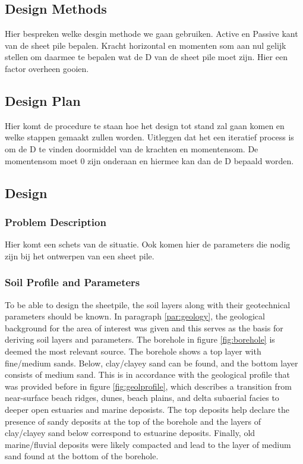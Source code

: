 \subsection{Design Methods}

Hier bespreken welke desgin methode we gaan gebruiken. Active en Passive kant van de sheet pile bepalen. Kracht horizontal en momenten som aan nul gelijk stellen om daarmee te bepalen wat de D van de sheet pile moet zijn. Hier een factor overheen gooien. 


\subsection{Design Plan}

Hier komt de procedure te staan hoe het design tot stand zal gaan komen en welke stappen gemaakt zullen worden. Uitleggen dat het een iteratief process is om de D te vinden doormiddel van de krachten en momentensom. De momentensom moet 0 zijn onderaan en hiermee kan dan de D bepaald worden. 

\subsection{Design}

\subsubsection{Problem Description}

Hier komt een schets van de situatie. Ook komen hier de parameters die nodig zijn bij het ontwerpen van een sheet pile.

\subsubsection{Soil Profile and Parameters}
To be able to design the sheetpile, the soil layers along with their geotechnical parameters should be known. In paragraph \ref{par:geology}, the geological background for the area of interest was given and this serves as the basis for deriving soil layers and parameters. The borehole in figure \ref{fig:borehole} is deemed the most relevant source. The borehole shows a top layer with fine/medium sands. Below, clay/clayey sand can be found, and the bottom layer consists of medium sand. This is in accordance with the geological profile that was provided before in figure \ref{fig:geolprofile}, which describes a transition from near-surface beach ridges, dunes, beach plains, and delta subaerial facies to deeper open estuaries and marine deposists. The top deposits help declare the presence of sandy deposits at the top of the borehole and the layers of clay/clayey sand below correspond to estuarine deposits. Finally, old marine/fluvial deposits were likely compacted and lead to the layer of medium sand found at the bottom of the borehole.

